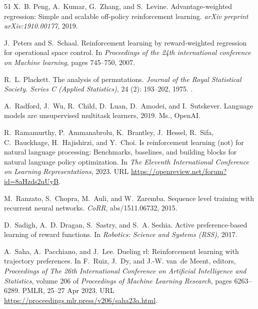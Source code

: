 \begin{thebibliography}{51}
X.~B. Peng, A.~Kumar, G.~Zhang, and S.~Levine.
\newblock Advantage-weighted regression: Simple and scalable off-policy
  reinforcement learning.
\newblock \emph{arXiv preprint arXiv:1910.00177}, 2019.

J.~Peters and S.~Schaal.
\newblock Reinforcement learning by reward-weighted regression for operational
  space control.
\newblock In \emph{Proceedings of the 24th international conference on Machine
  learning}, pages 745--750, 2007.

R.~L. Plackett.
\newblock The analysis of permutations.
\newblock \emph{Journal of the Royal Statistical Society. Series C (Applied
  Statistics)}, 24 (2): 193--202, 1975.
\newblock {}.

A.~Radford, J.~Wu, R.~Child, D.~Luan, D.~Amodei, and I.~Sutskever.
\newblock Language models are unsupervised multitask learners, 2019.
\newblock Ms., OpenAI.

R.~Ramamurthy, P.~Ammanabrolu, K.~Brantley, J.~Hessel, R.~Sifa, C.~Bauckhage,
  H.~Hajishirzi, and Y.~Choi.
\newblock Is reinforcement learning (not) for natural language processing:
  Benchmarks, baselines, and building blocks for natural language policy
  optimization.
\newblock In \emph{The Eleventh International Conference on Learning
  Representations}, 2023.
\newblock URL \url{https://openreview.net/forum?id=8aHzds2uUyB}.

M.~Ranzato, S.~Chopra, M.~Auli, and W.~Zaremba.
\newblock Sequence level training with recurrent neural networks.
\newblock \emph{CoRR}, abs/1511.06732, 2015.

D.~Sadigh, A.~D. Dragan, S.~Sastry, and S.~A. Seshia.
\newblock Active preference-based learning of reward functions.
\newblock In \emph{Robotics: Science and Systems (RSS)}, 2017.

A.~Saha, A.~Pacchiano, and J.~Lee.
\newblock Dueling rl: Reinforcement learning with trajectory preferences.
\newblock In F.~Ruiz, J.~Dy, and J.-W. van~de Meent, editors, \emph{Proceedings
  of The 26th International Conference on Artificial Intelligence and
  Statistics}, volume 206 of \emph{Proceedings of Machine Learning Research},
  pages 6263--6289. PMLR, 25--27 Apr 2023.
\newblock URL \url{https://proceedings.mlr.press/v206/saha23a.html}.


\end{thebibliography}
